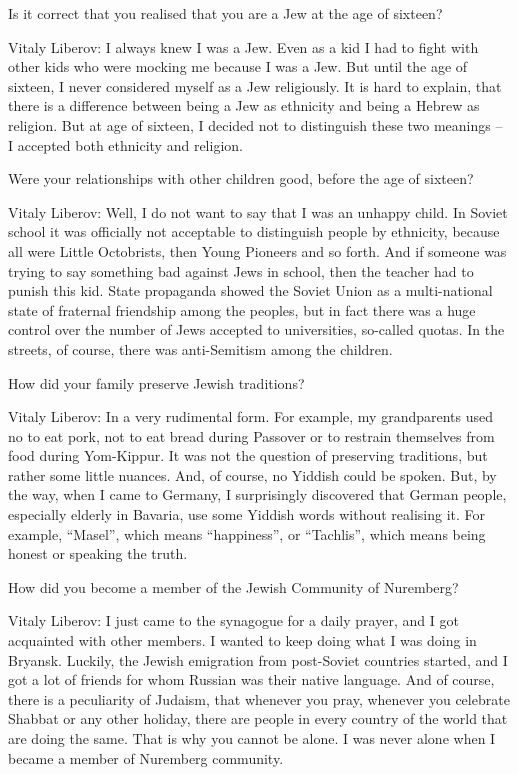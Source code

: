 Is it correct that you realised that you are a Jew at the age of sixteen? 

Vitaly Liberov: I always knew I was a Jew. Even as a kid I had to fight with other kids who were mocking me because I was a Jew. But until the age of sixteen, I never considered myself as a Jew religiously. It is hard to explain, that there is a difference between being a Jew as ethnicity and being a Hebrew as religion. But at age of sixteen, I decided not to distinguish these two meanings – I accepted both ethnicity and religion.  

Were your relationships with other children good, before the age of sixteen? 

Vitaly Liberov: Well, I do not want to say that I was an unhappy child. In Soviet school it was officially not acceptable to distinguish people by ethnicity, because all were Little Octobrists, then Young Pioneers and so forth. And if someone was trying to say something bad against Jews in school, then the teacher had to punish this kid. State propaganda showed the Soviet Union as a multi-national state of fraternal friendship among the peoples, but in fact there was a huge control over the number of Jews accepted to universities, so-called quotas. In the streets, of course, there was anti-Semitism among the children.  

 How did your family preserve Jewish traditions? 

Vitaly Liberov: In a very rudimental form. For example, my grandparents used no to eat pork, not to eat bread during Passover or to restrain themselves from food during Yom-Kippur. It was not the question of preserving traditions, but rather some little nuances. And, of course, no Yiddish could be spoken. But, by the way, when I came to Germany, I surprisingly discovered that German people, especially elderly in Bavaria, use some Yiddish words without realising it. For example, “Masel”, which means “happiness”, or “Tachlis”, which means being honest or speaking the truth.  

How did you become a member of the Jewish Community of Nuremberg? 

Vitaly Liberov: I just came to the synagogue for a daily prayer, and I got acquainted with other members. I wanted to keep doing what I was doing in Bryansk. Luckily, the Jewish emigration from post-Soviet countries started, and I got a lot of friends for whom Russian was their native language. And of course, there is a peculiarity of Judaism, that whenever you pray, whenever you celebrate Shabbat or any other holiday, there are people in every country of the world that are doing the same. That is why you cannot be alone. I was never alone when I became a member of Nuremberg community.  

